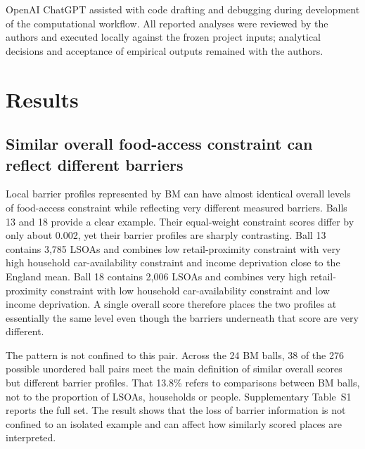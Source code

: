 \documentclass[11pt,a4paper]{article}
\begin{document}
OpenAI ChatGPT assisted with code drafting and debugging during development of the computational workflow. All reported analyses were reviewed by the authors and executed locally against the frozen project inputs; analytical decisions and acceptance of empirical outputs remained with the authors.

\section{Results}
\subsection{Similar overall food-access constraint can reflect different barriers}
Local barrier profiles represented by BM can have almost identical overall levels of food-access constraint while reflecting very different measured barriers. Balls 13 and 18 provide a clear example. Their equal-weight constraint scores differ by only about 0.002, yet their barrier profiles are sharply contrasting. Ball 13 contains 3,785 LSOAs and combines low retail-proximity constraint with very high household car-availability constraint and income deprivation close to the England mean. Ball 18 contains 2,006 LSOAs and combines very high retail-proximity constraint with low household car-availability constraint and low income deprivation. A single overall score therefore places the two profiles at essentially the same level even though the barriers underneath that score are very different.

The pattern is not confined to this pair. Across the 24 BM balls, 38 of the 276 possible unordered ball pairs meet the main definition of similar overall scores but different barrier profiles. That 13.8\% refers to comparisons between BM balls, not to the proportion of LSOAs, households or people. Supplementary Table~S1 reports the full set. The result shows that the loss of barrier information is not confined to an isolated example and can affect how similarly scored places are interpreted.
\end{document}
